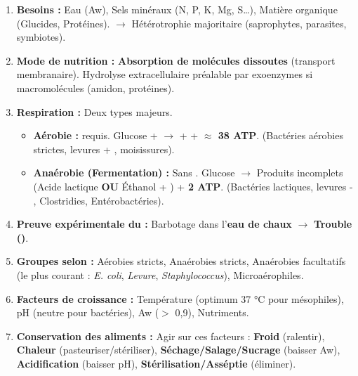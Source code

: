 \documentclass[11pt]{article}
\begin{document}
\begin{aretenir}
\begin{enumerate}
    \item \textbf{Besoins :} Eau (Aw), Sels minéraux (N, P, K, Mg, S…), Matière organique (Glucides, Protéines). $\rightarrow$ Hétérotrophie majoritaire (saprophytes, parasites, symbiotes).
    \item \textbf{Mode de nutrition :} \textbf{Absorption de molécules dissoutes} (transport membranaire). Hydrolyse extracellulaire préalable par exoenzymes si macromolécules (amidon, protéines).
    \item \textbf{Respiration :} Deux types majeurs.
        \begin{itemize}
            \item \textbf{Aérobie :}  requis. Glucose +  $\rightarrow$  +  + \textbf{$\approx$ 38 ATP}. (Bactéries aérobies strictes, levures + , moisissures).
            \item \textbf{Anaérobie (Fermentation) :} Sans . Glucose $\rightarrow$ Produits incomplets (Acide lactique \textbf{OU} Éthanol + ) + \textbf{2 ATP}. (Bactéries lactiques, levures - , Clostridies, Entérobactéries).
        \end{itemize}
    \item \textbf{Preuve expérimentale du  :} Barbotage dans l'\textbf{eau de chaux} $\rightarrow$ \textbf{Trouble ()}.
    \item \textbf{Groupes selon  :} Aérobies stricts, Anaérobies stricts, Anaérobies facultatifs (le plus courant : \emph{E. coli}, \emph{Levure}, \emph{Staphylococcus}), Microaérophiles.
    \item \textbf{Facteurs de croissance :} Température (optimum 37 °C pour mésophiles), pH (neutre pour bactéries), Aw ($>$ 0,9), Nutriments.
    \item \textbf{Conservation des aliments :} Agir sur ces facteurs : \textbf{Froid} (ralentir), \textbf{Chaleur} (pasteuriser/stériliser), \textbf{Séchage/Salage/Sucrage} (baisser Aw), \textbf{Acidification} (baisser pH), \textbf{Stérilisation/Asséptie} (éliminer).
\end{enumerate}
\end{aretenir}
\end{document}
